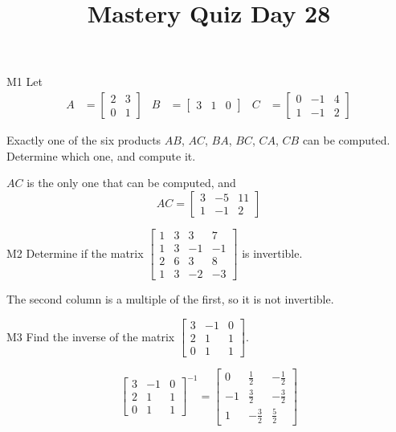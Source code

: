 \documentclass{sbgLAquiz}
\title{Mastery Quiz Day 28 }
\begin{document}
\begin{problem}{M1}
Let 
\begin{align*}
A &= \begin{bmatrix} 2 & 3 \\ 0 & 1 \end{bmatrix} & B&= \begin{bmatrix} 3 & 1 & 0 \end{bmatrix} & C&= \begin{bmatrix} 0 & -1 & 4 \\ 1 & -1 & 2 \end{bmatrix}
\end{align*}

Exactly one of the six products $AB$, $AC$, $BA$, $BC$, $CA$, $CB$ can be computed.  Determine which one, and compute it.
\end{problem}
\begin{solution}
$AC$ is the only one that can be computed, and 
$$AC = \begin{bmatrix} 3 & -5 & 11 \\ 1 & -1 & 2 \end{bmatrix}$$
\end{solution}

\begin{problem}{M2}
Determine if the matrix $\begin{bmatrix} 1 & 3 & 3 & 7 \\ 1 & 3 & -1 & -1 \\ 2 & 6 & 3 & 8 \\ 1 & 3 & -2 & -3 \end{bmatrix}$ is invertible.
\end{problem}
\begin{solution}
The second column is a multiple of the first, so it is not invertible.
\end{solution}



\begin{extract}\newpage\end{extract}
\begin{problem}{M3}
Find the inverse of the matrix $\begin{bmatrix} 3 & -1 & 0  \\ 2 & 1 & 1  \\ 0 & 1 & 1   \end{bmatrix}$.
\end{problem}
\begin{solution}
$$\begin{bmatrix} 3 & -1 & 0  \\ 2 & 1 & 1  \\ 0 & 1 & 1   \end{bmatrix}^{-1} = \begin{bmatrix} 0 & \frac{1}{2} & -\frac{1}{2} \\ -1 & \frac{3}{2} & -\frac{3}{2} \\ 1 & -\frac{3}{2} & \frac{5}{2}\end{bmatrix}$$
\end{solution}
\end{document}

